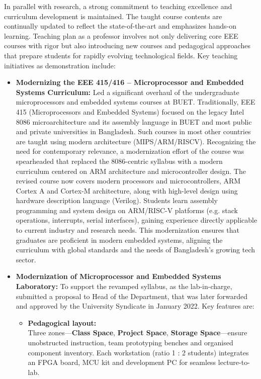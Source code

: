 \documentclass[cvauthor={Dr. Sajid Muhaimin Choudhury}]{buetcv}
\begin{document}
In parallel with research, a strong commitment to teaching excellence and curriculum development is maintained. The taught course contents are continually updated to reflect the state-of-the-art and emphasizes hands-on learning. Teaching plan as a professor involves not only delivering core EEE courses with rigor but also introducing new courses and pedagogical approaches that prepare students for rapidly evolving technological fields. Key teaching initiatives as demonstration include:
\begin{itemize}
    \item \textbf{Modernizing the EEE 415/416 – Microprocessor and Embedded Systems Curriculum:} Led a significant overhaul of the undergraduate microprocessors and embedded systems courses at BUET. Traditionally, EEE 415 (Microprocessors and Embedded Systems) focused on the legacy Intel 8086 microarchitecture and its assembly language in BUET and most public and private universities in Bangladesh. Such courses in most other countries are taught using modern architecture (MIPS/ARM/RISCV). Recognizing the need for contemporary relevance, a modernization effort of the course was spearheaded that replaced the 8086-centric syllabus with a modern curriculum centered on ARM architecture and microcontroller design. The revised course now covers modern processors and microcontrollers, ARM Cortex A and Cortex-M architecture, along with high-level design using hardware description language (Verilog). Students learn assembly programming and system design on ARM/RISC-V platforms (e.g. stack operations, interrupts, serial interfaces), gaining experience directly applicable to current industry and research needs. This modernization ensures that graduates are proficient in modern embedded systems, aligning the curriculum with global standards and the needs of Bangladesh’s growing tech sector.
    
    
    \item \textbf{Modernization of Microprocessor and Embedded Systems Laboratory:} To support the revamped syllabus, as the lab-in-charge, submitted a proposal to Head of the Department, that was later forwarded and approved by the University Syndicate in  January 2022. Key features are:
                                       
    \begin{itemize}
        \item \textbf{Pedagogical layout:} \\ Three zones—\textbf{Class Space}, \textbf{Project Space}, \textbf{Storage Space}—ensure unobstructed instruction, team prototyping benches and organised component inventory. Each workstation (ratio 1 : 2 students) integrates an FPGA board, MCU kit and development PC for seamless lecture-to-lab. 
    

\end{itemize}
\end{itemize}
\end{document}
